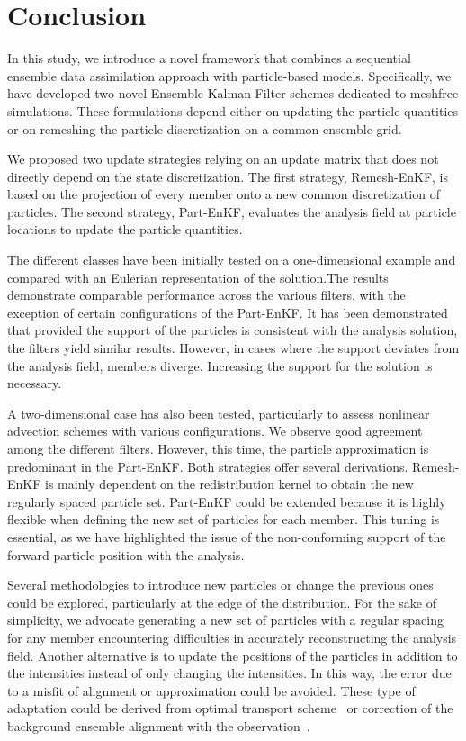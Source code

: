 
\section{Conclusion}
In this study, we introduce a novel framework that combines a sequential ensemble data assimilation approach with particle-based models. Specifically, we have developed two novel Ensemble Kalman Filter schemes dedicated to meshfree simulations. These formulations depend either on updating the particle quantities or on remeshing the particle discretization on a common ensemble grid.

We proposed two update strategies relying on an update matrix that does not directly depend on the state discretization. The first strategy, Remesh-EnKF, is based on the projection of every member onto a new common discretization of particles. The second strategy, Part-EnKF, evaluates the analysis field at particle locations to update the particle quantities.

The different classes have been initially tested on a one-dimensional example and compared with an Eulerian representation of the solution.The results demonstrate comparable performance across the various filters, with the exception of certain configurations of the Part-EnKF. It has been demonstrated that provided the support of the particles is consistent with the analysis solution, the filters yield similar results. However, in cases where the support deviates from the analysis field, members diverge. Increasing the support for the solution is necessary.

A two-dimensional case has also been tested, particularly to assess nonlinear advection schemes with various configurations. We observe good agreement among the different filters. However, this time, the particle approximation is predominant in the Part-EnKF.
Both strategies offer several derivations. Remesh-EnKF is mainly dependent on the redistribution kernel to obtain the new regularly spaced particle set. Part-EnKF could be extended because it is highly flexible when defining the new set of particles for each member. This tuning is essential, as we have highlighted the issue of the non-conforming support of the forward particle position with the analysis.

Several methodologies to introduce new particles or change the previous ones could be explored, particularly at the edge of the distribution.
For the sake of simplicity, we advocate generating a new set of particles with a regular spacing for any member encountering difficulties in accurately reconstructing the analysis field.
Another alternative is to update the positions of the particles in addition to the intensities instead of only changing the intensities. In this way, the error due to a misfit of alignment or approximation could be avoided. These type of adaptation could be derived from optimal transport scheme~\cite{bocquet_bridging_2023} or correction of the background ensemble alignment with the observation~\cite{ravela_data_2007,rosenthal_displacement_2017}.

\newpage